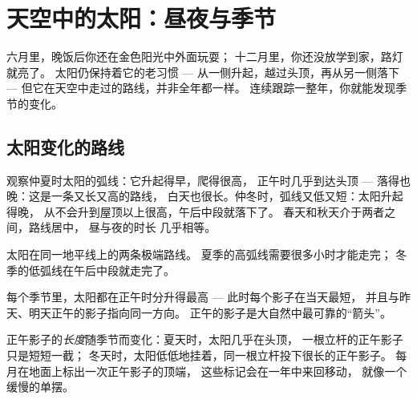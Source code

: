 \chapter{天空中的太阳：昼夜与季节}\label{ch:g3:sun-days-seasons}

六月里，晚饭后你还在金色阳光中外面玩耍；
十二月里，你还没放学到家，路灯就亮了。
太阳仍保持着它的老习惯 --- 从一侧升起，越过头顶，再从另一侧落下 ---
但它在天空中走过的路线，并非全年都一样。
连续跟踪一整年，你就能发现季节的变化。

\section{太阳变化的路线}

\begin{example}\label{ex:g3:sun-days-seasons:roads}
观察仲夏时太阳的弧线：它升起得早，爬得很高，
正午时几乎到达头顶 --- 落得也晚：这是一条又长又高的路线，
白天也很长。仲冬时，弧线又低又短：太阳升起得晚，
从不会升到屋顶以上很高，午后中段就落下了。
春天和秋天介于两者之间，路线居中，
昼与夜的时长
几乎相等。
\end{example}

\begin{omfigure}

{\small 太阳在同一地平线上的两条极端路线。
夏季的高弧线需要很多小时才能走完；
冬季的低弧线在午后中段就走完了。}
\end{omfigure}

\begin{proposition}[正午规律]\label{prop:g3:sun-days-seasons:midday}
每个季节里，太阳都在正午时分升得最高 ---
此时每个影子在当天最短，
并且与昨天、明天正午的影子指向同一方向。
正午的影子是大自然中最可靠的“箭头”。
\end{proposition}

\begin{example}[从影子读出季节]\label{ex:g3:sun-days-seasons:shadowlength}
正午影子的\emph{长度}随季节而变化：夏天时，太阳几乎在头顶，
一根立杆的正午影子只是短短一截；
冬天时，太阳低低地挂着，同一根立杆投下很长的正午影子。
每月在地面上标出一次正午影子的顶端，
这些标记会在一年中来回移动，
就像一个缓慢的单摆。
\end{example}

